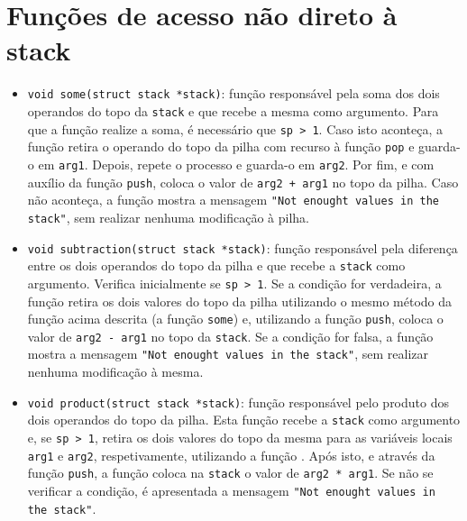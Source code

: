 \documentclass[12pt, a4paper]{article}
\begin{document}
    \section{Funções de acesso não direto à stack}
    \begin{itemize}
    
        \item \texttt{void some(struct stack *stack)}: função responsável pela soma dos dois operandos do topo da \texttt{stack} e que recebe a mesma como argumento. Para que a função realize a soma, é necessário que \texttt{sp > 1}. Caso isto aconteça, a função retira o operando do topo da pilha com recurso à função \texttt{pop} e guarda-o em \texttt{arg1}. Depois, repete o processo e guarda-o em \texttt{arg2}. Por fim, e com auxílio da função \texttt{push}, coloca o valor de \texttt{arg2 + arg1} no topo da pilha. Caso não aconteça, a função mostra a mensagem \texttt{"Not enought values in the stack"}, sem realizar nenhuma modificação à pilha.
        
        \item \texttt{void subtraction(struct stack *stack)}: função responsável pela diferença entre os dois operandos do topo da pilha e que recebe a \texttt{stack} como argumento. Verifica inicialmente se \texttt{sp > 1}. Se a condição for verdadeira, a função retira os dois valores do topo da pilha utilizando o mesmo método da função acima descrita (a função \texttt{some}) e, utilizando a função \texttt{push}, coloca o valor de \texttt{arg2 - arg1} no topo da \texttt{stack}. Se a condição for falsa, a função mostra a mensagem \texttt{"Not enought values in the stack"}, sem realizar nenhuma modificação à mesma.
        
        \item \texttt{void product(struct stack *stack)}: função responsável pelo produto dos dois operandos do topo da pilha. Esta função recebe a \texttt{stack} como argumento e, se \texttt{sp > 1}, retira os dois valores do topo da mesma para as variáveis locais \texttt{arg1} e \texttt{arg2}, respetivamente, utilizando a função . Após isto, e através da função \texttt{push}, a função coloca na \texttt{stack} o valor de \texttt{arg2 * arg1}. Se não se verificar a condição, é apresentada a mensagem \texttt{"Not enought values in the stack"}.
        

\end{itemize}
\end{document}
